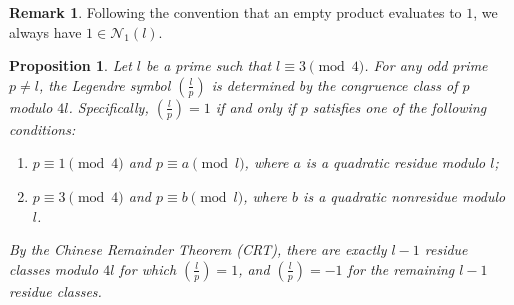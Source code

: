 \documentclass[11pt,a4paper]{amsart}
\theoremstyle{plain}
\newtheorem{proposition}[theorem]{Proposition}
\theoremstyle{definition}
\newtheorem{remark}[theorem]{Remark}
\begin{document}
\begin{remark}
Following the convention that an empty product evaluates to $1$, we always have $1 \in \mathcal{N}_1(l)$.
\end{remark}

\begin{proposition}\label{prop:leg_general_3mod4}
Let $l$ be a prime such that $l \equiv 3 \pmod 4$. For any odd prime $p \neq l$, the Legendre symbol $\left(\frac{l}{p}\right)$ is determined by the congruence class of $p$ modulo $4l$. Specifically, $\left(\frac{l}{p}\right) = 1$ if and only if $p$ satisfies one of the following conditions:
\begin{enumerate}[label=(\alph*)]
\item $p \equiv 1 \pmod 4$ and $p \equiv a \pmod l$, where $a$ is a quadratic residue modulo $l$;
    \item $p \equiv 3 \pmod 4$ and $p \equiv b \pmod l$, where $b$ is a quadratic nonresidue modulo $l$.
\end{enumerate}
By the Chinese Remainder Theorem (CRT), there are exactly $l-1$ residue classes modulo $4l$ for which $\left(\frac{l}{p}\right) = 1$, and $\left(\frac{l}{p}\right) = -1$ for the remaining $l-1$ residue classes.
\end{proposition}
\end{document}
